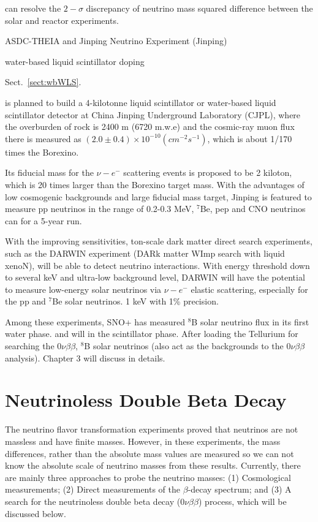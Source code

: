  can resolve the $2-\sigma$ discrepancy of neutrino mass squared difference between the solar and reactor experiments. 

ASDC-THEIA and Jinping Neutrino Experiment (Jinping)\cite{beacom2017physics}

water-based liquid scintillator 
doping

Sect.~\ref{sect:wbWLS}.


is planned to build a 4-kilotonne liquid scintillator or water-based liquid scintillator detector at China Jinping Underground Laboratory (CJPL), where the overburden of rock is 2400 m (6720 m.w.e) and the cosmic-ray muon flux there is measured as $(2.0\pm0.4)\times10^{-10}(cm^{-2}s^{-1})$\cite{beacom2017physics}, which is about 1/170 times the Borexino\cite{bellini2012cosmic}.

Its fiducial mass for the $\nu-e^-$ scattering events is proposed to be 2 kiloton, which is 20 times larger than the Borexino target mass. With the advantages of low cosmogenic backgrounds and large fiducial mass target, Jinping is featured to measure pp neutrinos in the range of 0.2-0.3 MeV, $^7$Be, pep and CNO neutrinos
can for a 5-year run\cite{beacom2017physics}. 

With the improving sensitivities, ton-scale dark matter direct search experiments, such as the DARWIN experiment (DARk matter WImp search with liquid xenoN), will be able to detect neutrino interactions\cite{aalbers2016darwin}. With energy threshold down to several keV and ultra-low background level, DARWIN will have the potential to measure low-energy solar neutrinos via $\nu-e^-$ elastic scattering, especially for the pp and $^7$Be solar neutrinos. 1 keV with 1\% precision\cite{baudis2014neutrino,aalbers2020solar}.

Among these experiments, SNO+ has measured $^8$B solar neutrino flux in its first water phase. 
and will in the scintillator phase.
After loading the Tellurium for searching the $0\nu\beta\beta$,  $^8$B solar neutrinos
(also act as the backgrounds to the $0\nu\beta\beta$ analysis). Chapter 3 will discuss in details.


\section{Neutrinoless Double Beta Decay}\label{sect:doublebeta}
The neutrino flavor transformation experiments proved that neutrinos are not massless and have finite masses. However, in these experiments, the mass differences, rather than the absolute mass values are measured so we can not know the absolute scale of neutrino masses from these results. Currently, there are mainly three approaches to probe the neutrino masses\cite{valle2015neutrinos}: (1) Cosmological measurements\cite{aghanim2020planck,dvorkin2019neutrino,lesgourgues2013neutrino}; (2) Direct measurements of the $\beta$-decay spectrum; and (3) A search for the neutrinoless double beta decay ($0\nu\beta\beta$) process, which will be discussed below.

